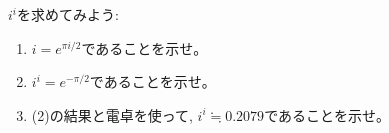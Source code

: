 \begin{q}\label{q:univ_comp_i_pow_i} $i^i$を求めてみよう:
\begin{enumerate}
\item $i=e^{\pi i/2}$であることを示せ。
\item $i^i=e^{-\pi/2}$であることを示せ。
\item (2)の結果と電卓を使って, $i^i\fallingdotseq 0.2079$であることを示せ。
\end{enumerate}\end{q}
\mv

